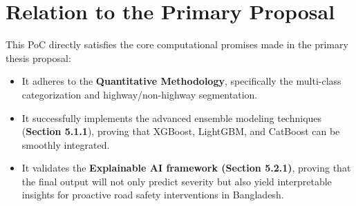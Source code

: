 \documentclass[11pt]{article}
\begin{document}
\section{Relation to the Primary Proposal}
This PoC directly satisfies the core computational promises made in the primary thesis proposal:
\begin{itemize}
    \item It adheres to the \textbf{Quantitative Methodology}, specifically the multi-class categorization and highway/non-highway segmentation.
    \item It successfully implements the advanced ensemble modeling techniques (\textbf{Section 5.1.1}), proving that XGBoost, LightGBM, and CatBoost can be smoothly integrated.
    \item It validates the \textbf{Explainable AI framework (Section 5.2.1)}, proving that the final output will not only predict severity but also yield interpretable insights for proactive road safety interventions in Bangladesh.
\end{itemize}
\end{document}
